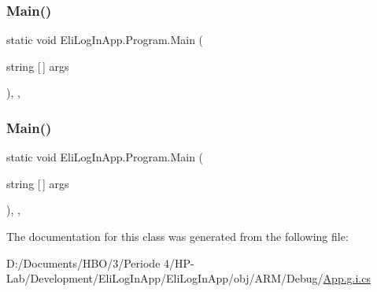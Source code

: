 \mbox{\label{class_eli_log_in_app_1_1_program_a858eac5e1cab1f27b9acac42228d699f}} 
\subsubsection{\texorpdfstring{Main()}{Main()}\hspace{0.1cm}{\footnotesize\ttfamily [2/3]}}
{\footnotesize\ttfamily static void Eli\+Log\+In\+App.\+Program.\+Main (\begin{DoxyParamCaption}\item[{string \mbox{[}$\,$\mbox{]}}]{args }\end{DoxyParamCaption})\hspace{0.3cm}{\ttfamily [inline]}, {\ttfamily [static]}, {\ttfamily [private]}}

\mbox{\label{class_eli_log_in_app_1_1_program_a858eac5e1cab1f27b9acac42228d699f}} 
\subsubsection{\texorpdfstring{Main()}{Main()}\hspace{0.1cm}{\footnotesize\ttfamily [3/3]}}
{\footnotesize\ttfamily static void Eli\+Log\+In\+App.\+Program.\+Main (\begin{DoxyParamCaption}\item[{string \mbox{[}$\,$\mbox{]}}]{args }\end{DoxyParamCaption})\hspace{0.3cm}{\ttfamily [inline]}, {\ttfamily [static]}, {\ttfamily [private]}}



The documentation for this class was generated from the following file\+:\begin{DoxyCompactItemize}
\item 
D\+:/\+Documents/\+H\+B\+O/3/\+Periode 4/\+H\+P-\/\+Lab/\+Development/\+Eli\+Log\+In\+App/\+Eli\+Log\+In\+App/obj/\+A\+R\+M/\+Debug/\hyperlink{_eli_log_in_app_2_eli_log_in_app_2obj_2_a_r_m_2_debug_2_app_8g_8i_8cs}{App.\+g.\+i.\+cs}\end{DoxyCompactItemize}
